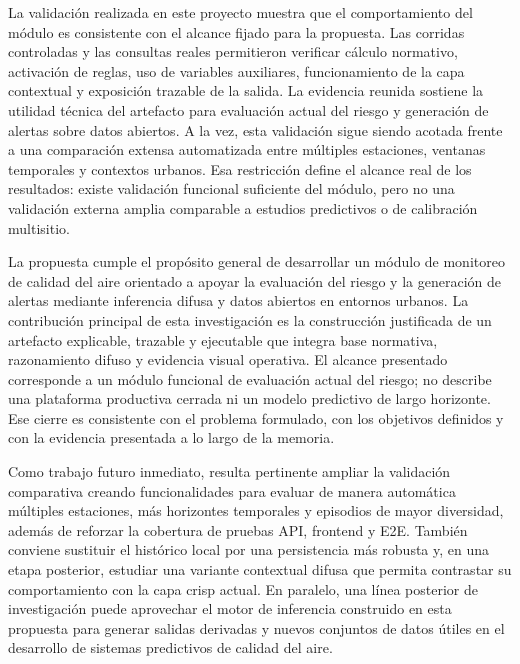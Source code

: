 La validación realizada en este proyecto muestra que el comportamiento del módulo es consistente con el alcance fijado para la propuesta. Las corridas controladas y las consultas reales permitieron verificar cálculo normativo, activación de reglas, uso de variables auxiliares, funcionamiento de la capa contextual y exposición trazable de la salida. La evidencia reunida sostiene la utilidad técnica del artefacto para evaluación actual del riesgo y generación de alertas sobre datos abiertos. A la vez, esta validación sigue siendo acotada frente a una comparación extensa automatizada entre múltiples estaciones, ventanas temporales y contextos urbanos. Esa restricción define el alcance real de los resultados: existe validación funcional suficiente del módulo, pero no una validación externa amplia comparable a estudios predictivos o de calibración multisitio.

La propuesta cumple el propósito general de desarrollar un módulo de monitoreo de calidad del aire orientado a apoyar la evaluación del riesgo y la generación de alertas mediante inferencia difusa y datos abiertos en entornos urbanos. La contribución principal de esta investigación es la construcción justificada de un artefacto explicable, trazable y ejecutable que integra base normativa, razonamiento difuso y evidencia visual operativa. El alcance presentado corresponde a un módulo funcional de evaluación actual del riesgo; no describe una plataforma productiva cerrada ni un modelo predictivo de largo horizonte. Ese cierre es consistente con el problema formulado, con los objetivos definidos y con la evidencia presentada a lo largo de la memoria.

Como trabajo futuro inmediato, resulta pertinente ampliar la validación comparativa creando funcionalidades para evaluar de manera automática múltiples estaciones, más horizontes temporales y episodios de mayor diversidad, además de reforzar la cobertura de pruebas API, frontend y E2E. También conviene sustituir el histórico local por una persistencia más robusta y, en una etapa posterior, estudiar una variante contextual difusa que permita contrastar su comportamiento con la capa crisp actual. En paralelo, una línea posterior de investigación puede aprovechar el motor de inferencia construido en esta propuesta para generar salidas derivadas y nuevos conjuntos de datos útiles en el desarrollo de sistemas predictivos de calidad del aire.
